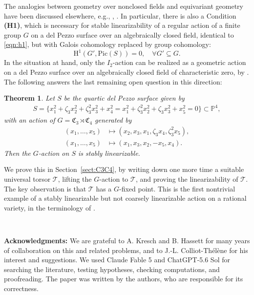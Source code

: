 \documentclass[12pt, reqno]{amsart}
\theoremstyle{plain}
\newtheorem{theo}[prop]{Theorem}
\theoremstyle{remark}
\theoremstyle{definition}
\numberwithin{equation}{section}
\def\cT{{\mathcal T}}
\def\fC{{\mathfrak C}}
\def\bP{{\mathbb P}}
\def\rH{{\mathrm H}}
\def\Pic{\mathrm{Pic}}
\begin{document}
The analogies between geometry over nonclosed fields and equivariant geometry have been discussed elsewhere, e.g., \cite{KT-survey}, \cite{KT-notions}. In particular, there is also a Condition {\bf (H1)}, which is necessary for stable linearizability of a regular action of a finite group $G$ on a del Pezzo surface over an algebraically closed field, identical to \eqref{eqn:h1}, but with Galois cohomology replaced by group cohomology:
$$
\rH^1(G',\Pic(S))=0, \quad \forall G'\subseteq G. 
$$
In the situation at hand, only the $I_2$-action can be realized as a geometric action on a del Pezzo surface over an algebraically closed field of characteristic zero, by \cite[Theorem 1.2]{Pro-2}. The following answers the last remaining open question in this direction: 

\begin{theo}\label{thm:main2}
    Let $S$ be the quartic del Pezzo surface given by 
    \begin{align*}
          S=\{x_1^2+\zeta_3x_2^2+\zeta_3^2x_3^2+x_4^2=x_1^2+\zeta_3^2x_2^2+\zeta_3x_3^2+x_5^2=0\}\subset\bP^4,
    \end{align*}
    with an action of $G=\fC_3\rtimes\fC_4$ generated by 
    \begin{align*}
        (x_1,\ldots,x_5)&\mapsto (x_2,x_3,x_1,\zeta_3x_4,\zeta_3^2x_5),\\
        (x_1,\ldots,x_5)&\mapsto (x_1,x_3,x_2,-x_5,x_4).
    \end{align*}
    Then the $G$-action on $S$ is stably linearizable. 
\end{theo}

We prove this in Section~\ref{sect:C3C4}, by writing down one more time a suitable universal torsor $\cT$, 
lifting the $G$-action to $\cT$, and proving the linearizability of $\cT$. The key observation is that $\cT$ has a $G$-fixed point. This is the first nontrivial example of a stably linearizable but not coarsely linearizable action on a rational variety, in the terminology of \cite{KT-notions}. 


\ 

{\bf Acknowledgments:} We are grateful to A. Kresch and B. Hassett for many years of collaboration on this and related problems, and to J.-L. Colliot-Th\'el\`ene for his interest and suggestions.  
We used Claude Fable 5 and ChatGPT-5.6 Sol for searching the literature, testing hypotheses, checking computations, and proofreading. 
The paper was written by the authors, who are responsible for its correctness.

    
\end{document}
